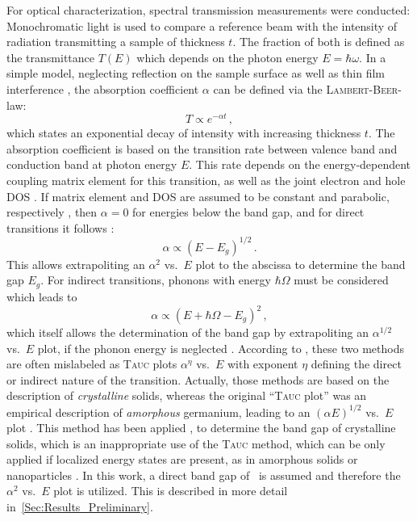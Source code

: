 For optical characterization, spectral transmission measurements were conducted:
Monochromatic light is used to compare a reference beam with the intensity of radiation transmitting a sample of thickness $t$.
The fraction of both is defined as the transmittance $T(E)$ which depends on the photon energy $E=\hbar\omega$.
In a simple model, neglecting reflection on the sample surface as well as thin film interference
    \cite{manifacier1977},
the absorption coefficient $\alpha$ can be defined via the \textsc{Lambert}-\textsc{Beer}-law:
\begin{equation}
    T\propto e^{-\alpha t}\,,
\end{equation}
which states an exponential decay of intensity with increasing thickness $t$.
The absorption coefficient is based on the transition rate between valence band and conduction band at photon energy $E$.
This rate depends on the energy-dependent coupling matrix element for this transition, as well as the joint electron and hole \gls{DOS}
    \cite{zanatta2019}.
If matrix element and \gls{DOS} are assumed to be constant and parabolic, respectively
    \cite{tauc2005},
then $\alpha=0$ for energies below the band gap, and for direct transitions it follows \cite{zanatta2019}:
\begin{equation}
    \alpha\propto (E-E_g)^{1/2}\,.
\end{equation}
This allows extrapoliting an $\alpha^2$ vs.\ $E$ plot to the abscissa to determine the band gap $E_g$.
For indirect transitions, phonons with energy $\hbar\Omega$ must be considered which leads to
\begin{equation}
    \alpha\propto (E+\hbar\Omega-E_g)^2\,,
\end{equation}
which itself allows the determination of the band gap by extrapoliting an $\alpha^{1/2}$ vs.\ $E$ plot, if the phonon energy is neglected
    \cite{zanatta2019}.
According to \textcite{zanatta2019}, these two methods are often mislabeled as \textsc{Tauc} plots $\alpha^\eta$ vs.\ $E$ with exponent $\eta$ defining the direct or indirect nature of the transition.
Actually, those methods are based on the description of \emph{crystalline} solids, whereas the original \enquote{\textsc{Tauc} plot} was an empirical description of \emph{amorphous} germanium, leading to an $(\alpha E)^{1/2}$ vs.\ $E$ plot
    \cite{tauc2005}.
This method has been applied
    \cite{cheng1996,al-kuhaili2007,singh2019,farrell2015},
to determine the band gap of crystalline solids, which is an inappropriate use of the \textsc{Tauc} method, which can be only applied if localized energy states are present, as in amorphous solids or nanoparticles
    \cite{dolgonos2016}.
In this work, a direct band gap of \cro\ is assumed and therefore the $\alpha^2$ vs.\ $E$ plot is utilized.
This is described in more detail in~\ref{Sec:Results_Preliminary}.


